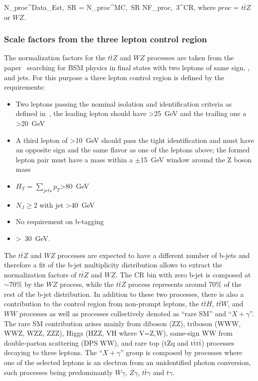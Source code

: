 {
N_{proc}^{Data_{Est},~SR}  = N_{proc}^{MC,~SR} \times NF_{proc,~3\ell}^{CR},
}
where $proc$ = $t\bar{t}Z$ or $WZ$.


\subsubsection{Scale factors from the three lepton control region}

The normalization factors for the $t\bar{t}Z$ and  $WZ$ processes are taken from the  paper~\cite{Sirunyan:2017uyt} searching for BSM physics in final states with two leptons of same sign, \MET, and jets. For this purpose a three lepton control region is defined by the requirements:
\begin{itemize}
\item Two leptons passing the nominal isolation and identification criteria as defined in~\cite{Sirunyan:2017uyt}, the leading lepton should have \pt>25~GeV and the trailing one a \pt>20~GeV
\item A third lepton of \pt>10~GeV should pass the tight identification and must have an opposite sign and the same flavor as one of the leptons above; the formed lepton pair must have a mass within a $\pm$15~GeV window around the Z boson mass
\item $H_{T}$ = $\displaystyle\sum_{jets} p_{T}$>80~GeV
\item $N_{J} \geq 2$ with jet \pt>40~GeV
\item No requirement on b-tagging
\item \MET>~30~GeV.
\end{itemize}

The $t\bar{t}Z$ and  $WZ$ processes are expected to have a different number of b-jets and  therefore a fit of the b-jet multiplicity distribution allows to extract the normalization factors of $t\bar{t}Z$ and $WZ$. The CR bin with zero b-jet  is composed at $\sim$70\% by the $WZ$ process, while the $t\bar{t}Z$ process represents around 70\% of the rest of the b-jet distribution. In addition to these two processes, there is also a contribution to the control region from non-prompt leptons, the $t\bar{t}H$,   $t\bar{t}W$, and $WW$ processes as well as processes collectively denoted as ``rare SM'' and ``$X+\gamma$''. The rare SM contribution arises mainly from diboson (ZZ), triboson (WWW, WWZ, WZZ, ZZZ), Higgs (HZZ, VH where V=Z,W), same-sign WW from double-parton scattering (DPS WW), and rare top (tZq and $\mathrm{t\bar{t}t\bar{t}}$) processes decaying to three leptons. The ``$X+\gamma$'' group is composed by processes where one of the selected leptons is an electron from an unidentified photon conversion, such processes being predominantly $W\gamma$, $Z\gamma$, $t\bar{t}\gamma$ and $t\gamma$.

